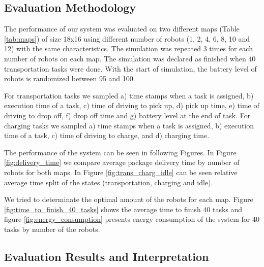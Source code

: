 \documentclass[journal]{IEEEtran}
\begin{document}
\subsection{Evaluation Methodology}
\label{evaluation_methodology}
The performance of our system was evaluated on two different maps (Table \ref{tab:maps}) of size 18x16 using different number of robots (1, 2, 4, 6, 8, 10 and 12) with the same characteristics. The simulation was repeated 3 times for each number of robots on each map. The simulation was declared as finished when 40 transportation tasks were done. With the start of simulation, the battery level of robots is randomized between 95 and 100.

For transportation tasks we sampled a) time stamps when a task is assigned, b) execution time of a task, c) time of driving to pick up, d) pick up time, e) time of driving to drop off, f) drop off time and g) battery level at the end of task. For charging tasks we sampled  a) time stamps when a task is assigned, b) execution time of a task, c) time of driving to charge, and d) charging time.

The performance of the system can be seen in following Figures. In Figure \ref{fig:delivery_time} we compare average package delivery time by number of robots for both maps. In Figure \ref{fig:trans_charg_idle} can be seen relative average time split of the states (transportation, charging and idle).

We tried to determinate the optimal amount of the robots for each map. Figure \ref{fig:time_to_finish_40_tasks} shows the average time to finish 40 tasks and figure \ref{fig:energy_consumption} presents energy consumption of the system for 40 tasks by number of the robots.

\subsection{Evaluation Results and Interpretation}
\end{document}

